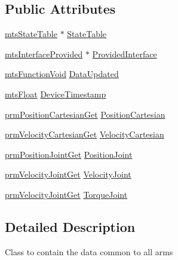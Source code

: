 \subsection*{Public Attributes}
\begin{DoxyCompactItemize}
\item 
\hyperlink{classmts_state_table}{mts\+State\+Table} $\ast$ \hyperlink{classmts_intuitive_da_vinci_1_1_arm_data_a46b59a678c5baaab10da5e4c7aaabe5e}{State\+Table}
\item 
\hyperlink{classmts_interface_provided}{mts\+Interface\+Provided} $\ast$ \hyperlink{classmts_intuitive_da_vinci_1_1_arm_data_a2e35a1f532d9d90100d6f58bad1ef7a0}{Provided\+Interface}
\item 
\hyperlink{classmts_function_void}{mts\+Function\+Void} \hyperlink{classmts_intuitive_da_vinci_1_1_arm_data_af71c6ee7db607fff0167e66926d6efea}{Data\+Updated}
\item 
\hyperlink{mts_generic_object_proxy_8h_a8750bcf116b87de6dedd90515e57eb6f}{mts\+Float} \hyperlink{classmts_intuitive_da_vinci_1_1_arm_data_a6318dd3fb2743ef06e676ea5e4e7a556}{Device\+Timestamp}
\item 
\hyperlink{classprm_position_cartesian_get}{prm\+Position\+Cartesian\+Get} \hyperlink{classmts_intuitive_da_vinci_1_1_arm_data_aa34441eee09790912bcee659dc805314}{Position\+Cartesian}
\item 
\hyperlink{classprm_velocity_cartesian_get}{prm\+Velocity\+Cartesian\+Get} \hyperlink{classmts_intuitive_da_vinci_1_1_arm_data_aa26ed3e13aeab62e1fdae9bd75ee170f}{Velocity\+Cartesian}
\item 
\hyperlink{classprm_position_joint_get}{prm\+Position\+Joint\+Get} \hyperlink{classmts_intuitive_da_vinci_1_1_arm_data_aa29266131113a857b0c972f804318dbd}{Position\+Joint}
\item 
\hyperlink{classprm_velocity_joint_get}{prm\+Velocity\+Joint\+Get} \hyperlink{classmts_intuitive_da_vinci_1_1_arm_data_a664aeae6730eb511571774698f962def}{Velocity\+Joint}
\item 
\hyperlink{classprm_velocity_joint_get}{prm\+Velocity\+Joint\+Get} \hyperlink{classmts_intuitive_da_vinci_1_1_arm_data_a2575a91719913cc0d8ce506c636fc9fa}{Torque\+Joint}
\end{DoxyCompactItemize}


\subsection{Detailed Description}
Class to contain the data common to all arms 

